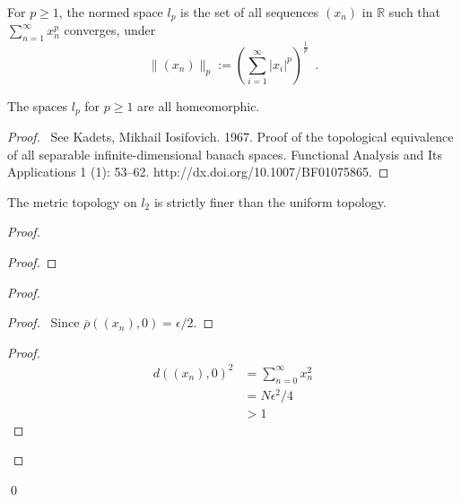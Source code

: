 \begin{df}
For $p \geq 1$, the normed space $l_p$ is the set of all sequences $(x_n)$ in $\mathbb{R}$ such that $\sum_{n=1}^\infty x_n^p$ converges, under
\[ \| (x_n) \|_p := \left( \sum_{i=1}^\infty |x_i|^p \right)^{\frac{1}{p}} \enspace . \]
\end{df}

\begin{prop}
The spaces $l_p$ for $p \geq 1$ are all homeomorphic.
\end{prop}

\begin{proof}
\pf\ See Kadets, Mikhail Iosifovich. 1967. Proof of the topological equivalence of all separable
infinite-dimensional banach spaces. Functional Analysis and Its Applications 1 (1): 53–62.
http://dx.doi.org/10.1007/BF01075865.
\end{proof}

\begin{prop}
The metric topology on $l_2$ is strictly finer than the uniform topology.
\end{prop}

\begin{proof}
\pf
{}
\begin{proof}
\end{proof}
\begin{proof}
	\begin{proof}
		\pf\ Since $\overline{\rho}((x_n),0) = \epsilon / 2$.
	\end{proof}
	\begin{proof}
		\pf
		\begin{align*}
			d((x_n),0)^2 & = \sum_{n=0}^\infty x_n^2 \\
			& = N \epsilon^2 / 4 \\
			& > 1 
		\end{align*}
	\end{proof}
\end{proof}
\qed
\end{proof}

